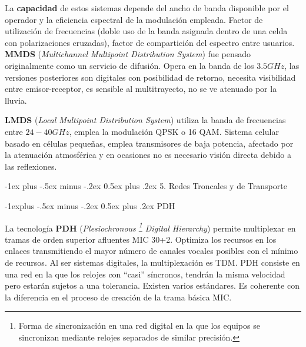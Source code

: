 \documentclass[10pt,portrait, twocolumn]{article}
\makeatletter
\renewcommand{\section}{\@startsection{section}{1}{0mm}%
                                {-1ex plus -.5ex minus -.2ex}%
                                {0.5ex plus .2ex}%
                                {\normalfont\large\bfseries}}
\renewcommand{\subsection}{\@startsection{subsection}{2}{0mm}%
                                {-1explus -.5ex minus -.2ex}%
                                {0.5ex plus .2ex}%
                                {\normalfont\normalsize\bfseries}}
\renewcommand{\subsubsection}{\@startsection{subsubsection}{3}{0mm}%
                                {-1ex plus -.5ex minus -.2ex}%
                                {1ex plus .2ex}%
                                {\normalfont\small\bfseries}}
\makeatother
\begin{document}

La \textbf{capacidad} de estos sistemas depende del ancho de banda disponible por el operador y la eficiencia espectral de la modulación empleada. Factor de utilización de frecuencias (doble uso de la banda asignada dentro de una celda con polarizaciones cruzadas), factor de compartición del espectro entre usuarios.\\


\textbf{MMDS} (\textit{Multichannel Multipoint Distribution System}) fue pensado originalmente como un servicio de difusión. Opera en la banda de los $3.5 GHz$, las versiones posteriores son digitales con posibilidad de retorno, necesita visibilidad entre emisor-receptor, es sensible al multitrayecto, no se ve atenuado por la lluvia.


\textbf{LMDS} (\textit{Local Multipoint Distribution System}) utiliza la banda de frecuencias entre $24-40 GHz$, emplea la modulación QPSK o 16 QAM. Sistema celular basado en células pequeñas, emplea transmisores de baja potencia, afectado por la atenuación atmosférica y en ocasiones no es necesario visión directa debido a las reflexiones.



\newpage

\hrulefill

\section{5. Redes Troncales y de Transporte}

\hrulefill

\subsection{PDH}

La tecnología \textbf{PDH} (\textit{Plesiochronous \footnote{Forma de sincronización en una red digital en la que los equipos se sincronizan mediante relojes separados de similar precisión.} Digital Hierarchy}) permite multiplexar en tramas de orden superior afluentes MIC 30+2. Optimiza los recursos en los enlaces transmitiendo el mayor número de canales vocales posibles con el mínimo de recursos. Al ser sistemas digitales, la multiplexación es TDM. PDH consiste en una red en la que los relojes con ``casi'' síncronos, tendrán la misma velocidad pero estarán sujetos a una tolerancia. Existen varios estándares. Es coherente con la diferencia en el proceso de creación de la trama básica MIC.\\
\end{document}
